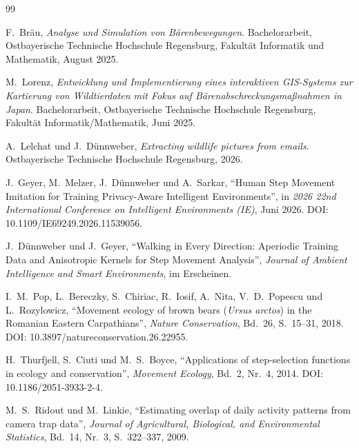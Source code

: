 \documentclass[12pt,a4paper]{scrreprt}
\begin{document}
%
\begin{thebibliography}{99}

F.~Bräu,
\emph{Analyse und Simulation von Bärenbewegungen}.
Bachelorarbeit, Ostbayerische Technische Hochschule Regensburg,
Fakultät Informatik und Mathematik, August 2025.

M.~Lorenz,
\emph{Entwicklung und Implementierung eines interaktiven GIS-Systems zur
Kartierung von Wildtierdaten mit Fokus auf
Bärenabschreckungsmaßnahmen in Japan}.
Bachelorarbeit, Ostbayerische Technische Hochschule Regensburg,
Fakultät Informatik/Mathematik, Juni 2025.

A.~Lelchat und J.~Dünnweber,
\emph{Extracting wildlife pictures from emails}.
Ostbayerische Technische Hochschule Regensburg, 2026.

J.~Geyer, M.~Melzer, J.~Dünnweber und A.~Sarkar,
"`Human Step Movement Imitation for Training Privacy-Aware Intelligent
Environments"', in \emph{2026 22nd International Conference on
Intelligent Environments (IE)}, Juni 2026.
DOI: 10.1109/IE69249.2026.11539056.

J.~Dünnweber und J.~Geyer,
"`Walking in Every Direction: Aperiodic Training Data and Anisotropic
Kernels for Step Movement Analysis"',
\emph{Journal of Ambient Intelligence and Smart Environments},
im Erscheinen.

I.~M.~Pop, L.~Bereczky, S.~Chiriac, R.~Iosif, A.~Nita, V.~D.~Popescu
und L.~Rozylowicz,
"`Movement ecology of brown bears (\emph{Ursus arctos}) in the Romanian
Eastern Carpathians"', \emph{Nature Conservation}, Bd.~26,
S.~15--31, 2018. DOI: 10.3897/natureconservation.26.22955.

H.~Thurfjell, S.~Ciuti und M.~S.~Boyce,
"`Applications of step-selection functions in ecology and
conservation"', \emph{Movement Ecology}, Bd.~2, Nr.~4, 2014.
DOI: 10.1186/2051-3933-2-4.

M.~S.~Ridout und M.~Linkie,
"`Estimating overlap of daily activity patterns from camera trap
data"', \emph{Journal of Agricultural, Biological, and Environmental
Statistics}, Bd.~14, Nr.~3, S.~322--337, 2009.


\end{thebibliography}
\end{document}
